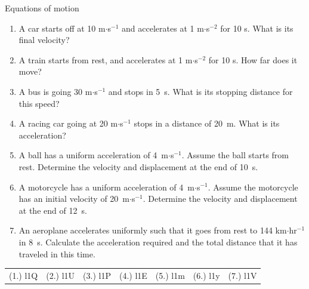 \begin{exercises}{Equations of motion}
            \nopagebreak \noindent
          \label{m38796*id79517}\begin{enumerate}[noitemsep, label=\textbf{\arabic*}. ] 
\label{m38796*uid144}\item A car starts off at 10 m$\ensuremath{\cdot}$s${}^{-1}$ and accelerates at 1 m$\ensuremath{\cdot}$s${}^{-2}$ for 10 s. What is its final velocity?\newline
\label{m38796*uid145}\item A train starts from rest, and accelerates at 1 m$\ensuremath{\cdot}$s${}^{-2}$ for 10 s. How far does it move?\newline
\label{m38796*uid146}\item A bus is going 30 m$\ensuremath{\cdot}$s${}^{-1}$ and stops in 5~s. What is its stopping distance for this speed?\newline
\label{m38796*uid147}\item A racing car going at 20 m$\ensuremath{\cdot}$s${}^{-1}$ stops in a distance of 20~m. What is its acceleration?\newline
\label{m38796*uid148}\item A ball has a uniform acceleration of 4~m$\ensuremath{\cdot}$s${}^{-1}$. Assume the ball starts from rest. Determine the velocity and displacement at the end of 10~s.\newline
\label{m38796*uid149}\item A motorcycle has a uniform acceleration of 4~m$\ensuremath{\cdot}$s${}^{-1}$. Assume the motorcycle has an initial velocity of 20~m$\ensuremath{\cdot}$s${}^{-1}$. Determine the velocity and displacement at the end of 12~s.\newline
\label{m38796*uid150}\item An aeroplane accelerates uniformly such that it goes from rest to 144 km$\ensuremath{\cdot}$hr${}^{-1}$in 8~s. Calculate the acceleration required and the total distance that it has traveled in this time.\newline
\end{enumerate}
    \label{m38796*cid11}
\par \practiceinfo
 \par \begin{tabular}[h]{cccccc}
 (1.) l1Q  &  (2.) l1U  &  (3.) l1P  &  (4.) l1E  &  (5.) l1m  &  (6.) l1y  & (7.) l1V \end{tabular}
\end{exercises}

